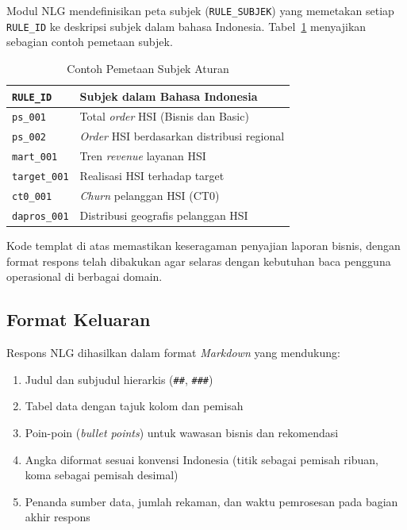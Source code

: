 Modul NLG mendefinisikan peta subjek (\texttt{RULE\_SUBJEK}) yang memetakan setiap \texttt{RULE\_ID} ke deskripsi subjek dalam bahasa Indonesia. Tabel~\ref{tab:rule-subjek} menyajikan sebagian contoh pemetaan subjek.

\begin{table}[htbp]
\centering
\caption{Contoh Pemetaan Subjek Aturan}
\label{tab:rule-subjek}
\begin{tabular}{|p{2.5cm}|p{10cm}|}
\hline
\textbf{\texttt{RULE\_ID}} & \textbf{Subjek dalam Bahasa Indonesia} \\
\hline
\texttt{ps\_001} & Total \textit{order} HSI (Bisnis dan Basic) \\
\hline
\texttt{ps\_002} & \textit{Order} HSI berdasarkan distribusi regional \\
\hline
\texttt{mart\_001} & Tren \textit{revenue} layanan HSI \\
\hline
\texttt{target\_001} & Realisasi HSI terhadap target \\
\hline
\texttt{ct0\_001} & \textit{Churn} pelanggan HSI (CT0) \\
\hline
\texttt{dapros\_001} & Distribusi geografis pelanggan HSI \\
\hline
\end{tabular}
\end{table}

Kode templat di atas memastikan keseragaman penyajian laporan bisnis, dengan format respons telah dibakukan agar selaras dengan kebutuhan baca pengguna operasional di berbagai domain.

\subsection{Format Keluaran}

Respons NLG dihasilkan dalam format \textit{Markdown} yang mendukung:

\begin{enumerate}
    \item Judul dan subjudul hierarkis (\texttt{\#\#}, \texttt{\#\#\#})
    \item Tabel data dengan tajuk kolom dan pemisah
    \item Poin-poin (\textit{bullet points}) untuk wawasan bisnis dan rekomendasi
    \item Angka diformat sesuai konvensi Indonesia (titik sebagai pemisah ribuan, koma sebagai pemisah desimal)
    \item Penanda sumber data, jumlah rekaman, dan waktu pemrosesan pada bagian akhir respons
\end{enumerate}

